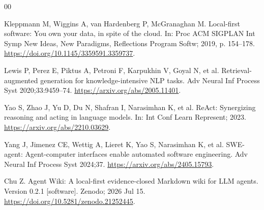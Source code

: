 \documentclass[preprint,12pt,a4paper]{elsarticle}
\begin{document}
\begin{thebibliography}{00}

Kleppmann M, Wiggins A, van Hardenberg P, McGranaghan M. Local-first software:
You own your data, in spite of the cloud. In: Proc ACM SIGPLAN Int Symp New
Ideas, New Paradigms, Reflections Program Softw; 2019, p. 154--178.
\url{https://doi.org/10.1145/3359591.3359737}.

Lewis P, Perez E, Piktus A, Petroni F, Karpukhin V, Goyal N, et al.
Retrieval-augmented generation for knowledge-intensive NLP tasks. Adv Neural
Inf Process Syst 2020;33:9459--74.
\url{https://arxiv.org/abs/2005.11401}.

Yao S, Zhao J, Yu D, Du N, Shafran I, Narasimhan K, et al. ReAct: Synergizing
reasoning and acting in language models. In: Int Conf Learn Represent; 2023.
\url{https://arxiv.org/abs/2210.03629}.

Yang J, Jimenez CE, Wettig A, Lieret K, Yao S, Narasimhan K, et al. SWE-agent:
Agent-computer interfaces enable automated software engineering. Adv Neural Inf
Process Syst 2024;37.
\url{https://arxiv.org/abs/2405.15793}.

Chu Z. Agent Wiki: A local-first evidence-closed Markdown wiki for LLM agents.
Version 0.2.1 [software]. Zenodo; 2026 Jul 15.
\url{https://doi.org/10.5281/zenodo.21252445}.

\end{thebibliography}
\end{document}
